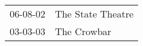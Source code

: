 \begin{supertabular}{p{0.25\columnwidth}p{0.75\columnwidth}}
 06-08-02 &  The State Theatre \\
 03-03-03 &        The Crowbar \\
\end{supertabular}
